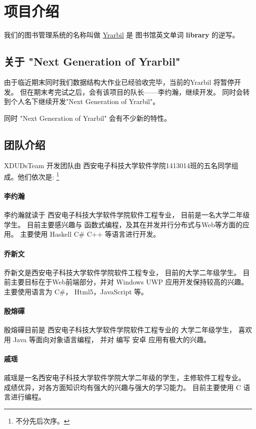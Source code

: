 

\section*{项目介绍}
我们的图书管理系统的名称叫做 \href{http://yrarbil.iok.la}{Yrarbil} 是 图书馆英文单词 \textbf{library} 的逆写。

\subsection*{关于 "Next Generation of Yrarbil"}
由于临近期末同时我们数据结构大作业已经验收完毕，当前的Yrarbil 将暂停开发。
但在期末考完试之后，会有该项目的队长——李约瀚，继续开发。
同时会转到个人名下继续开发"Next Generation of Yrarbil"。

同时 "Next Generation of Yrarbil" 会有不少新的特性。 

\subsection*{团队介绍}
XDUDsTeam 开发团队由 西安电子科技大学软件学院1413014班的五名同学组成。他们依次是: 
\footnote{不分先后次序。}

\paragraph{李约瀚} 
李约瀚就读于 西安电子科技大学软件学院软件工程专业，
目前是一名大学二年级学生。
目前主要感兴趣与 函数式编程，及其在并发并行分布式与Web等方面的应用。
主要使用 Haskell C\# C++ 等语言进行开发。

\paragraph{乔新文} 
乔新文是西安电子科技大学软件学院软件工程专业，
目前的大学二年级学生。
目前主要目标在于Web前端部分，并对 Windows UWP 应用开发保持较高的兴趣。
主要使用语言为 C\#， Html5，JavaScript 等。

\paragraph{殷熔磾}
殷熔磾目前是 西安电子科技大学软件学院软件工程专业的 大学二年级学生，
喜欢用 Java 等面向对象语言编程，
并对 编写 安卓 应用有极大的兴趣。

\paragraph{戚瑶}
戚瑶是一名西安电子科技大学软件学院大学二年级的学生，主修软件工程专业。
成绩优异，对各方面知识均有强大的兴趣与强大的学习能力。
目前主要使用 C 语言进行编程。

